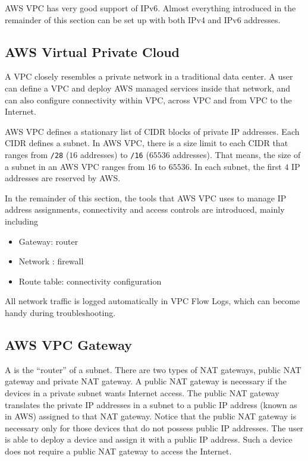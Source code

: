 AWS VPC has very good support of IPv6. Almost everything introduced in the remainder of this section can be set up with both IPv4 and IPv6 addresses.

\subsection{AWS Virtual Private Cloud}

A VPC closely resembles a private network in a traditional data center. A user can define a VPC and deploy AWS managed services inside that network, and can also configure connectivity within VPC, across VPC and from VPC to the Internet.

AWS VPC defines a stationary list of CIDR blocks of private IP addresses. Each CIDR defines a subnet. In AWS VPC, there is a size limit to each CIDR that ranges from \texttt{/28} ($16$ addresses) to \texttt{/16} ($65536$ addresses). That means, the size of a subnet in an AWS VPC ranges from $16$ to $65536$. In each subnet, the first $4$ IP addresses are reserved by AWS.

In the remainder of this section, the tools that AWS VPC uses to manage IP address assignments, connectivity and access controls are introduced, mainly including
\begin{itemize}
  \item Gateway: router
  \item Network : firewall
  \item Route table: connectivity configuration
\end{itemize}

All network traffic is logged automatically in VPC Flow Logs, which can become handy during troubleshooting.

\subsection{AWS VPC Gateway}

A  is the ``router'' of a subnet. There are two types of NAT gateways, public NAT gateway and private NAT gateway. A public NAT gateway is necessary if the devices in a private subnet wants Internet access. The public NAT gateway translates the private IP addresses in a subnet to a public IP address (known as  in AWS) assigned to that NAT gateway. Notice that the public NAT gateway is necessary only for those devices that do not possess public IP addresses. The user is able to deploy a device and assign it with a public IP address. Such a device does not require a public NAT gateway to access the Internet.

